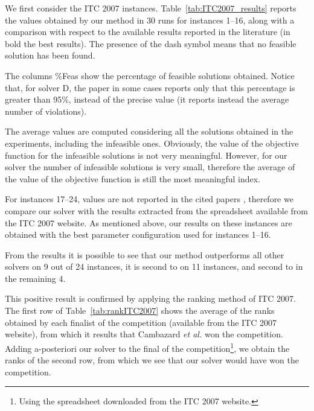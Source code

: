 \documentclass[authoryear,preprint,a4paper,12pt]{elsarticle}
\begin{document}
We first consider the ITC 2007 instances.
Table~\ref{tab:ITC2007_results} reports the values obtained by our
method in 30 runs for instances 1--16, along with a comparison with
respect to the available results reported in the literature (in bold
the best results). The presence of the  dash symbol means that no feasible solution has been found.

The columns \%Feas show the percentage of feasible
solutions obtained. Notice that, for solver D, the paper in some cases
reports only that this percentage is greater than 95\%, instead of the
precise value (it reports instead the average number of violations).

The average values are computed considering all the solutions obtained
in the experiments, including the infeasible ones. Obviously, the
value of the objective function for the infeasible solutions is not
very meaningful. However, for our solver the number of infeasible
solutions is very small, therefore the average of the value of the
objective function is still the most meaningful index.

For instances 17--24, values are not reported in the cited papers
\citep[except for][]{BrHu10}, therefore we compare our solver with the results
extracted from the spreadsheet available from the ITC 2007 website. 
As mentioned above, our results on these instances are obtained with the best parameter configuration used for instances 1--16. 

From the results it is possible to see that our method outperforms all
other solvers on 9 out of 24 instances, it is second to
\citeauthor{CHOP10} on 11 instances, and second to \citeauthor{MNCR08}
in the remaining 4.

This positive result is confirmed by applying the ranking method of
ITC 2007. The first row of Table~\ref{tab:rankITC2007} shows the
average of the ranks obtained by each finalist of the competition
(available from the ITC 2007 website), from which it results that
Cambazard \emph{et al.} won the competition. Adding a-posteriori our
solver to the final of the competition\footnote{Using the spreadsheet
  downloaded from the ITC 2007 website.}, we obtain the ranks of the
second row, from which we see that our solver would have won the
competition.
\end{document}
